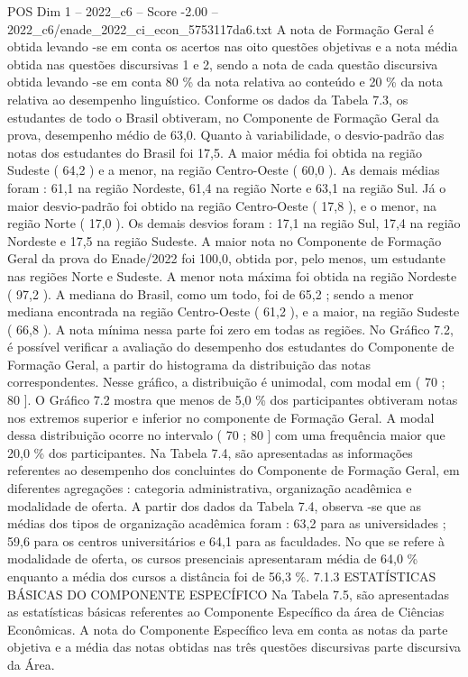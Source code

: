 \begin{textsample}{POS Dim 1 – 2022\_c6 – Score -2.00 – 2022\_c6/enade\_2022\_ci\_econ\_5753117da6.txt}
A nota de Formação Geral é obtida levando -se em conta os acertos nas oito questões objetivas e a nota média obtida nas questões discursivas 1 e 2, sendo a nota de cada questão discursiva obtida levando -se em conta 80 \% da nota relativa ao conteúdo e 20 \% da nota relativa ao desempenho linguístico.
Conforme os dados da Tabela 7.3, os estudantes de todo o Brasil obtiveram, no Componente de Formação Geral da prova, desempenho médio de 63,0.
Quanto à variabilidade, o desvio-padrão das notas dos estudantes do Brasil foi 17,5.
A maior média foi obtida na região Sudeste ( 64,2 ) e a menor, na região Centro-Oeste ( 60,0 ).
As demais médias foram : 61,1 na região Nordeste, 61,4 na região Norte e 63,1 na região Sul.
Já o maior desvio-padrão foi obtido na região Centro-Oeste ( 17,8 ), e o menor, na região Norte ( 17,0 ).
Os demais desvios foram : 17,1 na região Sul, 17,4 na região Nordeste e 17,5 na região Sudeste.
A maior nota no Componente de Formação Geral da prova do Enade/2022 foi 100,0, obtida por, pelo menos, um estudante nas regiões Norte e Sudeste.
A menor nota máxima foi obtida na região Nordeste ( 97,2 ).
A mediana do Brasil, como um todo, foi de 65,2 ; sendo a menor mediana encontrada na região Centro-Oeste ( 61,2 ), e a maior, na região Sudeste ( 66,8 ).
A nota mínima nessa parte foi zero em todas as regiões.
No Gráfico 7.2, é possível verificar a avaliação do desempenho dos estudantes do Componente de Formação Geral, a partir do histograma da distribuição das notas correspondentes.
Nesse gráfico, a distribuição é unimodal, com modal em ( 70 ; 80 ].
O Gráfico 7.2 mostra que menos de 5,0 \% dos participantes obtiveram notas nos extremos superior e inferior no componente de Formação Geral.
A modal dessa distribuição ocorre no intervalo ( 70 ; 80 ] com uma frequência maior que 20,0 \% dos participantes.
Na Tabela 7.4, são apresentadas as informações referentes ao desempenho dos concluintes do Componente de Formação Geral, em diferentes agregações : categoria administrativa, organização acadêmica e modalidade de oferta.
A partir dos dados da Tabela 7.4, observa -se que as médias dos tipos de organização acadêmica foram : 63,2 para as universidades ; 59,6 para os centros universitários e 64,1 para as faculdades.
No que se refere à modalidade de oferta, os cursos presenciais apresentaram média de 64,0 \% enquanto a média dos cursos a distância foi de 56,3 \%. 7.1.3 ESTATÍSTICAS BÁSICAS DO COMPONENTE ESPECÍFICO Na Tabela 7.5, são apresentadas as estatísticas básicas referentes ao Componente Específico da área de Ciências Econômicas.
A nota do Componente Específico leva em conta as notas da parte objetiva e a média das notas obtidas nas três questões discursivas parte discursiva da Área.

\end{textsample}

